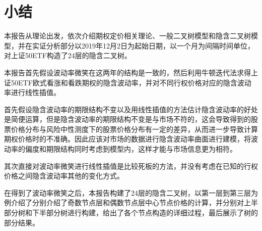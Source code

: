 \chapter{小结}
\thispagestyle{fancy}

本报告从理论出发，依次介绍期权定价相关理论、一般二叉树模型和隐含二叉树模型，并在实证分析部分以2019年12月2日为起始日期，以一个月为间隔时间单位，对上证50ETF构造了24层的隐含二叉树。

本报告首先假设波动率微笑在这两年的结构是一致的，然后利用牛顿迭代法求得上证50ETF欧式看涨和看跌期权的隐含波动率，并对不同行权价格对应的隐含波动率进行线性插值。

首先假设隐含波动率的期限结构不变以及用线性插值的方法估计隐含波动率的好处是简便运算，但是隐含波动率的期限结构不变是与市场不符的，这会导致得到的股票价格分布与风险中性测度下的股票价格分布有一定的差异，从而进一步导致计算期权价格时的不准确。因此应该对市场的数据进行隐含波动率曲面进行建模，将波动率的偏度和期限结构同时考虑到模型内，这样才能与市场信息更为相符。

其次直接对波动率微笑进行线性插值是比较死板的方法，并没有考虑在已知的行权价格之间隐含波动率其他的变化方式。

在得到了波动率微笑之后，本报告构建了24层的隐含二叉树，以第一层到第三层为例介绍了分别介绍了奇数节点层和偶数节点层中心节点价格的计算，并分别对上半部分树和下半部分树进行构建，给出了各个节点构造的详细过程，最后展示了树的部分结果。